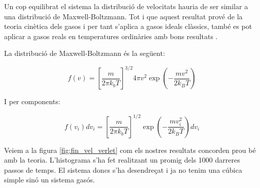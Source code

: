 \documentclass[a4paper,10pt]{article}
\begin{document}
Un cop equilibrat el sistema la distribució de velocitats hauria de ser similar a una distribució de Maxwell-Boltzmann. Tot i que aquest resultat prové de la teoria cinètica dels gasos i per tant s'aplica a gasos ideals clàssics, també es pot aplicar a gasos reals en temperatures ordinàries amb bons resultats \cite{StadPhys}. 

La distribució de Maxwell-Boltzmann és la següent:

\begin{equation}
	f(v) = \left[\frac{m}{2\pi k_b T}\right]^{3/2} 4\pi v^2 \exp\left(-\frac{mv^2}{2k_B T} \right)
\end{equation}

I per components:

\begin{equation}
	f(v_i) dv_i = \left[\frac{m}{2\pi k_b T}\right]^{1/2}  \exp\left(-\frac{mv_i^2}{2k_B T} \right) dv_i
\end{equation}

Veiem a la figura \ref{fig:fin_vel_verlet} com els nostres resultats concorden prou bé amb la teoria. L'histograma s'ha fet realitzant un promig dels 1000 darreres passos de temps. El sistema doncs s'ha desendreçat i ja no tenim una cúbica simple sinó un sistema gasós.
\end{document}

